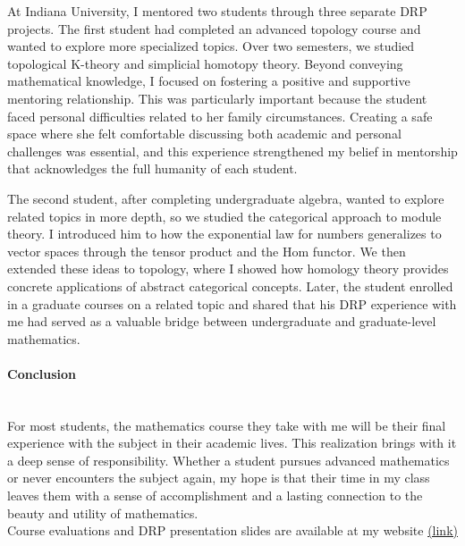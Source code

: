 \documentclass[11pt]{article}
\begin{document}
At Indiana University, I mentored two students through three separate DRP projects. The first student had completed an advanced topology course and wanted to explore more specialized topics. Over two semesters, we studied topological K-theory and simplicial homotopy theory. Beyond conveying mathematical knowledge, I focused on fostering a positive and supportive mentoring relationship. This was particularly important because the student faced personal difficulties related to her family circumstances. Creating a safe space where she felt comfortable discussing both academic and personal challenges was essential, and this experience strengthened my belief in mentorship that acknowledges the full humanity of each student.

The second student, after completing undergraduate algebra, wanted to explore related topics in more depth, so we studied the categorical approach to module theory. I introduced him to how the exponential law for numbers generalizes to vector spaces through the tensor product and the Hom functor. We then extended these ideas to topology, where I showed how homology theory provides concrete applications of abstract categorical concepts. Later, the student enrolled in a graduate courses on a related topic and shared that his DRP experience with me had served as a valuable bridge between undergraduate and graduate-level mathematics.

\paragraph{Conclusion} \quad \\
For most students, the mathematics course they take with me will be their final experience with the subject in their academic lives. This realization brings with it a deep sense of responsibility. Whether a student pursues advanced mathematics or never encounters the subject again, my hope is that their time in my class leaves them with a sense of accomplishment and a lasting connection to the beauty and utility of mathematics.
\\

\noindent Course evaluations and DRP presentation slides are available at my website \href{https://sites.google.com/view/myungsin-cho/teaching?authuser=0}{(link)}
\end{document}
